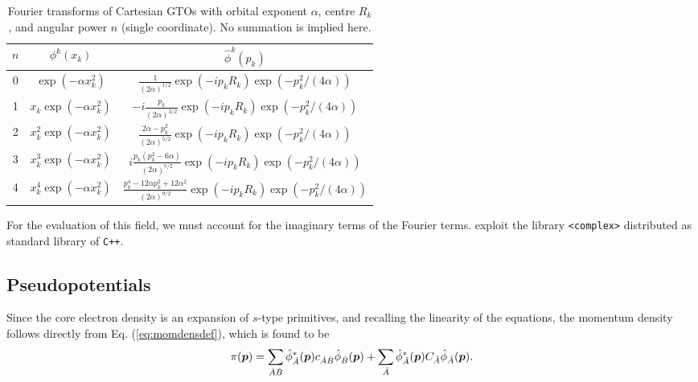 \begin{table}[ht!]
\begin{center}
\begin{tabular}{||c|c|c||}
\hline
\hline
   $n$ & $\phi^k(x_k)$ & $\hat{\phi}^k(p_k)$\\
\hline
   0 & $\exp(-\alpha x_k^2)$  & $\frac{1}{(2\alpha)^{1/2}}\exp(-ip_kR_k)\exp(-p_k^2/(4\alpha))$ \\
\hline
   1 & $x_k\exp(-\alpha x_k^2)$ & $-i\frac{p_k}{(2\alpha)^{3/2}}\exp(-ip_kR_k)\exp(-p_k^2/(4\alpha))$\\
\hline
   2 & $x_k^2\exp(-\alpha x_k^2)$ & $\frac{2\alpha-p_k^2}{(2\alpha)^{5/2}}\exp(-ip_kR_k)\exp(-p_k^2/(4\alpha))$ \\
\hline
   3 & $x_k^3\exp(-\alpha x_k^2)$ & $i\frac{p_k(p_k^2-6\alpha)}{(2\alpha)^{7/2}}\exp(-ip_kR_k)\exp(-p_k^2/(4\alpha))$ \\
\hline
   4 & $x_k^4\exp(-\alpha x_k^2)$ & $\frac{p_k^4-12\alpha p_k^2+12\alpha^2}{(2\alpha)^{9/2}}\exp(-ip_kR_k)\exp(-p_k^2/(4\alpha))$ \\
\hline
\hline
\end{tabular}
\caption{Fourier transforms of Cartesian GTOs with orbital exponent $\alpha$, centre $R_k$, and angular power $n$ (single coordinate). No summation is implied here.}\label{tab:momdensang}
\end{center}
\end{table}

For the evaluation of this field, we must account for the imaginary terms of the Fourier terms. \DTK{} exploit the library \texttt{<complex>} distributed as standard library of \texttt{C++}. 

\subsection{Pseudopotentials}

Since the core electron density is an expansion of $s$-type primitives, and recalling
the linearity of the equations, the momentum density follows directly from Eq.
(\ref{eq:momdensdef}), which is found to be
%
\begin{equation}%
  \pi(\boldsymbol{p})=\sum_{\dA\dB}
   \hat{\phi}_{\dA}^*(\boldsymbol{p})c_{\dA\dB}\hat{\phi}_{\dB}(\boldsymbol{p})+
   \sum_{\bA}
   \hat{\phi}_{\bA}^*(\boldsymbol{p})C_{\bA}\hat{\phi}_{\bA}(\boldsymbol{p}).
\end{equation}
%


